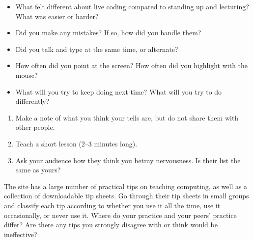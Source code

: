 \begin{itemize}

\item
  What felt different about live coding compared to standing up and lecturing?
  What was easier or harder?

\item
  Did you make any mistakes?
  If so, how did you handle them?

\item
  Did you talk and type at the same time, or alternate?

\item
  How often did you point at the screen?
  How often did you highlight with the mouse?

\item
  What will you try to keep doing next time?
  What will you try to do differently?

\end{itemize}


\begin{enumerate}

\item
  Make a note of what you think your tells are,
  but do not share them with other people.

\item
  Teach a short lesson (2--3 minutes long).

\item
  Ask your audience how they think you betray nervousness.
  Is their list the same as yours?

\end{enumerate}


The  site
has a large number of practical tips on teaching computing,
as well as a collection of downloadable tip sheets.
Go through their tip sheets in small groups and classify each tip
according to whether you use it all the time,
use it occasionally,
or never use it.
Where do your practice and your peers' practice differ?
Are there any tips you strongly disagree with or think would be ineffective?
